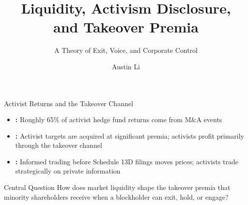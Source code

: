 \documentclass[aspectratio=169,10pt]{beamer}
\title{Liquidity, Activism Disclosure,\\ and Takeover Premia}
\subtitle{A Theory of Exit, Voice, and Corporate Control}
\author[Austin Li]{Austin Li}
\institute{University College London}
\date{}
\newcommand{\1}{\mathbf{1}}
\begin{document}

\begin{frame}
  \titlepage
\end{frame}


\begin{frame}{Activist Returns and the Takeover Channel}
\hypertarget{main:motivation}{}
\begin{itemize}\itemsep0.5em
  \item \textbf{\citealp{BravJiangPartnoyThomas2008}:} Roughly 65\% of activist hedge fund returns come from M\&A events
  \item \textbf{\citealp{GreenwoodSchor2009}:} Activist targets are acquired at significant premia; activists profit primarily through the takeover channel
  \item \textbf{\citealp{CollinDufresneFos2015}:} Informed trading before Schedule 13D filings moves prices; activists trade strategically on private information
\end{itemize}

\vspace{0.5em}

\begin{block}{Central Question}
How does market liquidity shape the takeover premia that minority shareholders receive when a blockholder can exit, hold, or engage?
\end{block}
\end{frame}
\end{document}
